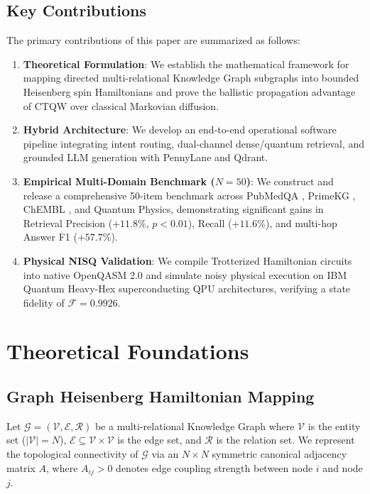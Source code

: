 \documentclass[conference]{IEEEtran}
\begin{document}
\subsection{Key Contributions}
The primary contributions of this paper are summarized as follows:
\begin{enumerate}
    \item \textbf{Theoretical Formulation}: We establish the mathematical framework for mapping directed multi-relational Knowledge Graph subgraphs into bounded Heisenberg spin Hamiltonians and prove the ballistic propagation advantage of CTQW over classical Markovian diffusion.
    \item \textbf{Hybrid Architecture}: We develop an end-to-end operational software pipeline integrating intent routing, dual-channel dense/quantum retrieval, and grounded LLM generation with PennyLane and Qdrant.
    \item \textbf{Empirical Multi-Domain Benchmark ($N=50$)}: We construct and release a comprehensive 50-item benchmark across PubMedQA \cite{jin2019pubmedqa}, PrimeKG \cite{chandak2023building}, ChEMBL \cite{gaulton2012chembl}, and Quantum Physics, demonstrating significant gains in Retrieval Precision ($+11.8\%$, $p < 0.01$), Recall ($+11.6\%$), and multi-hop Answer F1 ($+57.7\%$).
    \item \textbf{Physical NISQ Validation}: We compile Trotterized Hamiltonian circuits into native OpenQASM 2.0 and simulate noisy physical execution on IBM Quantum Heavy-Hex superconducting QPU architectures, verifying a state fidelity of $\mathcal{F} = 0.9926$.
\end{enumerate}

\section{Theoretical Foundations}

\subsection{Graph Heisenberg Hamiltonian Mapping}
Let $\mathcal{G} = (\mathcal{V}, \mathcal{E}, \mathcal{R})$ be a multi-relational Knowledge Graph where $\mathcal{V}$ is the entity set ($|\mathcal{V}| = N$), $\mathcal{E} \subseteq \mathcal{V} \times \mathcal{V}$ is the edge set, and $\mathcal{R}$ is the relation set. We represent the topological connectivity of $\mathcal{G}$ via an $N \times N$ symmetric canonical adjacency matrix $A$, where $A_{ij} > 0$ denotes edge coupling strength between node $i$ and node $j$.
\end{document}
